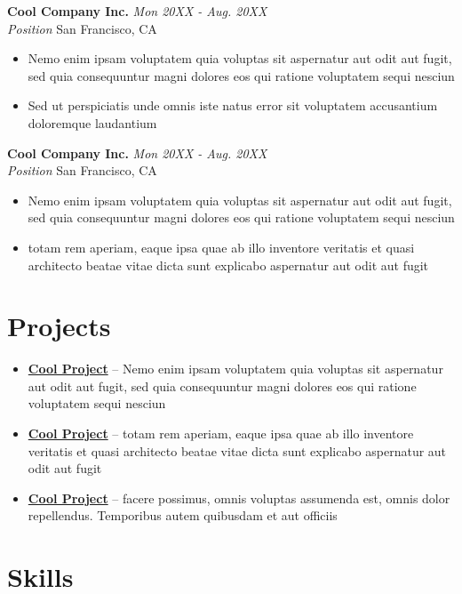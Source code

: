 \documentclass[letterpaper,10pt]{article}
\newcommand{\organization}[4]{
    \vspace{1.5pt}
    \textbf{#1} \hfill{\emph{#2}} \\
    \emph{#3} \hfill{#4} \\
    \vspace{3pt}
}
\newcommand{\pro}[3]{
    \item \href{#2}{\textbf{#1}} -- {#3}
}
\newcommand{\bulletsBegin}{
    \vspace{1pt}
    \begin{minipage}{17.6cm} 
    \begin{itemize}[leftmargin=0.6cm]
    \setlength\itemsep{-0.009em}
}
\newcommand{\bulletsEnd}{
    \end{itemize}\vspace{0pt}
    \end{minipage}
}
\begin{document}
        \organization{Cool Company Inc.}{Mon 20XX - Aug. 20XX}
        {Position}{San Francisco, CA}
        \bulletsBegin
            \item Nemo enim ipsam voluptatem quia voluptas sit aspernatur aut odit aut fugit, sed quia consequuntur magni dolores eos qui ratione voluptatem sequi nesciun
            \item Sed ut perspiciatis unde omnis iste natus error sit voluptatem accusantium doloremque laudantium
        \bulletsEnd

        \organization{Cool Company Inc.}{Mon 20XX - Aug. 20XX}
        {Position}{San Francisco, CA}
        \bulletsBegin
            \item Nemo enim ipsam voluptatem quia voluptas sit aspernatur aut odit aut fugit, sed quia consequuntur magni dolores eos qui ratione voluptatem sequi nesciun
            \item totam rem aperiam, eaque ipsa quae ab illo inventore veritatis et quasi architecto beatae vitae dicta sunt explicabo aspernatur aut odit aut fugit
        \bulletsEnd

    \section{Projects}

    
        \bulletsBegin
            \vspace{-3pt}
        \pro{Cool Project}
            {https://github.com/example/project}
            {Nemo enim ipsam voluptatem quia voluptas sit aspernatur aut odit aut fugit, sed quia consequuntur magni dolores eos qui ratione voluptatem sequi nesciun}
        \pro{Cool Project}
            {https://github.com/example/project}
            {totam rem aperiam, eaque ipsa quae ab illo inventore veritatis et quasi architecto beatae vitae dicta sunt explicabo aspernatur aut odit aut fugit}
        \pro{Cool Project}
            {https://github.com/example/project}
            {facere possimus, omnis voluptas assumenda est, omnis dolor repellendus. Temporibus autem quibusdam et aut officiis}
        
        
        \bulletsEnd

    \section{Skills}
    
\end{document}
